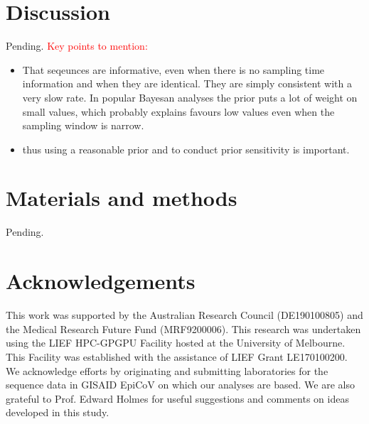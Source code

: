 \documentclass[11pt]{article}
\begin{document}
\section{Discussion}
Pending.
\textcolor{red}{Key points to mention:}

\begin{itemize}
	\item That seqeunces are informative, even when there is no sampling time information and when they are identical. They are simply consistent with a very slow rate. In popular Bayesan analyses the prior puts a lot of weight on small values, which probably explains favours low values even when the sampling window is narrow.
	\item thus using a reasonable prior and to conduct prior sensitivity is important. 
\end{itemize}


\section{Materials and methods}
Pending.


\section{Acknowledgements}
This work was supported by the Australian Research Council (DE190100805) and the Medical Research Future Fund (MRF9200006). This research was undertaken using the LIEF HPC-GPGPU Facility hosted at the University of Melbourne. This Facility was established with the assistance of LIEF Grant LE170100200. We acknowledge efforts by originating and submitting laboratories for the sequence data in GISAID EpiCoV on which our analyses are based. We are also grateful to Prof. Edward Holmes for useful suggestions and comments on ideas developed in this study.



%

\end{document}
